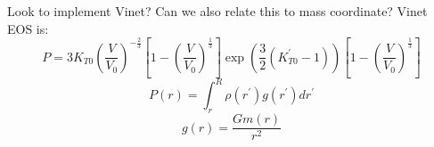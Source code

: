\documentclass[12pt,notitlepage]{article}
\begin{document}
Look to implement Vinet?  Can we also relate this to mass coordinate?  Vinet EOS is:
\begin{equation}
P = 3 K_{T0} \left( \frac{V}{V_0} \right)^{-\frac{2}{3}} \left[1-\left( \frac{V}{V_0}\right)^\frac{1}{3} \right] \exp \left( \frac{3}{2} ( K_{T0}^\prime-1) \right) \left[1-\left( \frac{V}{V_0}\right)^\frac{1}{3} \right] 
\end{equation}
\begin{equation}
P(r) = \int_r^R \rho(r^\prime) g(r^\prime) dr^\prime
\end{equation}
\begin{equation}
g(r) = \frac{G m(r)}{r^2}
\end{equation}
\end{document}
